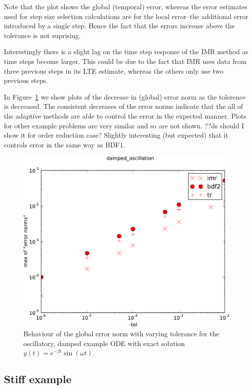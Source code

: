 Note that the plot shows the global (temporal) error, whereas the error estimates used for step size selection calculations are for the local error--the additional error introduced by a single step.
Hence the fact that the errors increase above the tolerance is not suprising.

Interestingly there is a slight lag on the time step response of the IMR method as time steps become larger.
This could be due to the fact that IMR uses data from three previous steps in its LTE estimate, whereas the others only use two previous steps.

In Figure~\ref{fig:imr-osc-example-scatter} we show plots of the decrease in (global) error norm as the tolerence is decreased. 
The consistent decreases of the error norms indicate that the all of the adaptive methods are able to control the error in the expected manner.
Plots for other example problems are very similar and so are not shown.
??ds should I show it for order reduction case? Slightly interesting (but expected) that it controls error in the same way as BDF1.

\begin{figure}[h!]
  \centering \includegraphics[width=1\textwidth]{aimr/damped_oscillation-maxoferrornormsvs-tol}
  \caption{Behaviour of the global error norm with varying tolerance for the oscillatory, damped example ODE with exact solution $y(t) = e^{-\beta t} \sin(\omega t)$.}
  \label{fig:imr-osc-example-scatter}
\end{figure}

\subsection{Stiff example}
\label{sec:imr-stiff-example}

